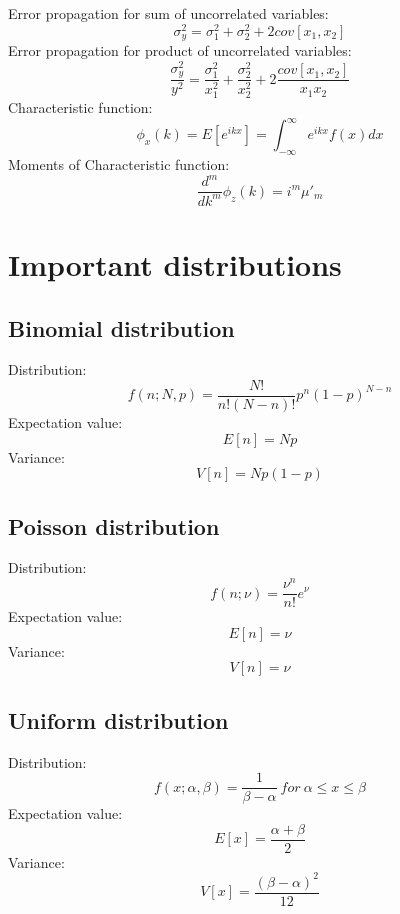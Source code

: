 \documentclass[12pt]{book}
\begin{document}
Error propagation for sum of uncorrelated variables:
\begin{equation}
	\sigma^2_y = \sigma^2_1 + \sigma^2_2 +2cov[x_1,x_2]
\end{equation}
Error propagation for product of uncorrelated variables:
\begin{equation}
	\frac{\sigma^2_y}{y^2} = \frac{\sigma^2_1}{x^2_1} + \frac{\sigma^2_2}{x^2_2} + 2\frac{cov[x_1,x_2]}{x_1x_2}
\end{equation}
Characteristic function:
\begin{equation}
	\phi_x(k) = E[e^{ikx}] = \int_{-\infty}^\infty e^{ikx}f(x)dx
\end{equation}
Moments of Characteristic function:
\begin{equation}
	\frac{d^m}{dk^m}\phi_z(k) = i^m \mu'_m
\end{equation}
\section{Important distributions}
\subsection{Binomial distribution}
Distribution:
\begin{equation}
	f(n;N,p) = \frac{N!}{n!(N-n)!}p^n(1-p)^{N-n}
\end{equation}
Expectation value:
\begin{equation}
	E[n] = Np
\end{equation}
Variance:
\begin{equation}
	V[n] = Np(1-p)
\end{equation}
\subsection{Poisson distribution}
Distribution:
\begin{equation}
	f(n;\nu) = \frac{\nu^n}{n!}e^{\nu}
\end{equation}
Expectation value:
\begin{equation}
	E[n] = \nu
\end{equation}
Variance:
\begin{equation}
	V[n] = \nu
\end{equation}
\subsection{Uniform distribution}
Distribution:
\begin{equation}
	f(x;\alpha,\beta) = \frac{1}{\beta-\alpha} \ for \ \alpha \leq x \leq \beta 
\end{equation}
Expectation value:
\begin{equation}
	E[x] = \frac{\alpha + \beta}{2}
\end{equation}
Variance:
\begin{equation}
	V[x] = \frac{(\beta - \alpha)^2}{12}
\end{equation}
\end{document}
